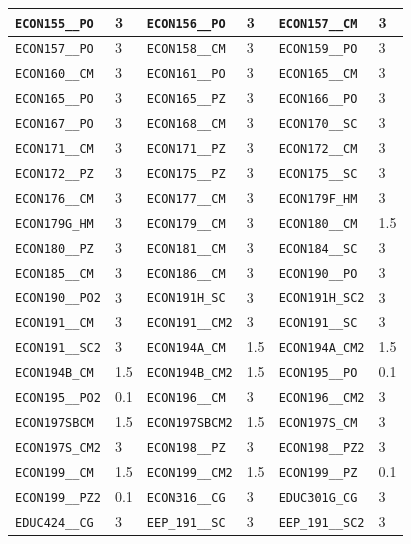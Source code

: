 \begin{longtable}{|l|l||l|l||l|l|}
    \verb|ECON155__PO| & 3 & \verb|ECON156__PO| & 3 & \verb|ECON157__CM| & 3\\\hline
    \verb|ECON157__PO| & 3 & \verb|ECON158__CM| & 3 & \verb|ECON159__PO| & 3\\\hline
    \verb|ECON160__CM| & 3 & \verb|ECON161__PO| & 3 & \verb|ECON165__CM| & 3\\\hline
    \verb|ECON165__PO| & 3 & \verb|ECON165__PZ| & 3 & \verb|ECON166__PO| & 3\\\hline
    \verb|ECON167__PO| & 3 & \verb|ECON168__CM| & 3 & \verb|ECON170__SC| & 3\\\hline
    \verb|ECON171__CM| & 3 & \verb|ECON171__PZ| & 3 & \verb|ECON172__CM| & 3\\\hline
    \verb|ECON172__PZ| & 3 & \verb|ECON175__PZ| & 3 & \verb|ECON175__SC| & 3\\\hline
    \verb|ECON176__CM| & 3 & \verb|ECON177__CM| & 3 & \verb|ECON179F_HM| & 3\\\hline
    \verb|ECON179G_HM| & 3 & \verb|ECON179__CM| & 3 & \verb|ECON180__CM| & 1.5\\\hline
    \verb|ECON180__PZ| & 3 & \verb|ECON181__CM| & 3 & \verb|ECON184__SC| & 3\\\hline
    \verb|ECON185__CM| & 3 & \verb|ECON186__CM| & 3 & \verb|ECON190__PO| & 3\\\hline
    \verb|ECON190__PO2| & 3 & \verb|ECON191H_SC| & 3 & \verb|ECON191H_SC2| & 3\\\hline
    \verb|ECON191__CM| & 3 & \verb|ECON191__CM2| & 3 & \verb|ECON191__SC| & 3\\\hline
    \verb|ECON191__SC2| & 3 & \verb|ECON194A_CM| & 1.5 & \verb|ECON194A_CM2| & 1.5\\\hline
    \verb|ECON194B_CM| & 1.5 & \verb|ECON194B_CM2| & 1.5 & \verb|ECON195__PO| & 0.1\\\hline
    \verb|ECON195__PO2| & 0.1 & \verb|ECON196__CM| & 3 & \verb|ECON196__CM2| & 3\\\hline
    \verb|ECON197SBCM| & 1.5 & \verb|ECON197SBCM2| & 1.5 & \verb|ECON197S_CM| & 3\\\hline
    \verb|ECON197S_CM2| & 3 & \verb|ECON198__PZ| & 3 & \verb|ECON198__PZ2| & 3\\\hline
    \verb|ECON199__CM| & 1.5 & \verb|ECON199__CM2| & 1.5 & \verb|ECON199__PZ| & 0.1\\\hline
    \verb|ECON199__PZ2| & 0.1 & \verb|ECON316__CG| & 3 & \verb|EDUC301G_CG| & 3\\\hline
    \verb|EDUC424__CG| & 3 & \verb|EEP_191__SC| & 3 & \verb|EEP_191__SC2| & 3\\\hline

\end{longtable}
